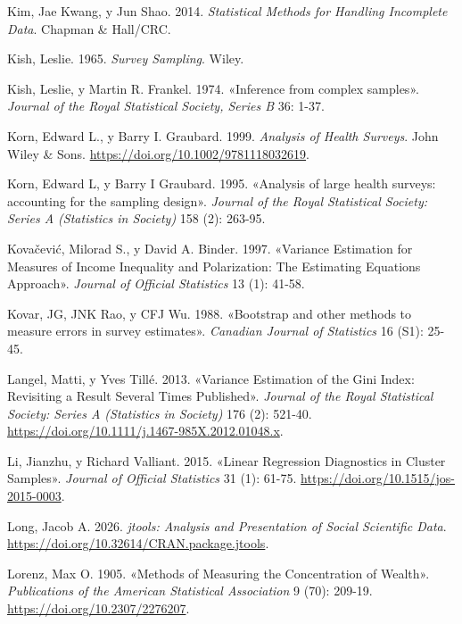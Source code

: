 \documentclass[
  spanish,
  11pt,
  letterpaper,
  oneside,
  open=any]{scrbook}
\newlength{\cslhangindent}
\newenvironment{CSLReferences}[2] %
 {\begin{list}{}{%
  \setlength{\itemindent}{0pt}
  \setlength{\leftmargin}{0pt}
  \setlength{\parsep}{0pt}
  \ifodd #1
   \setlength{\leftmargin}{\cslhangindent}
   \setlength{\itemindent}{-1\cslhangindent}
  \fi
  \setlength{\itemsep}{#2\baselineskip}}}
 {\end{list}}
\begin{document}
\begin{CSLReferences}{1}{1}
Kim, Jae Kwang, y Jun Shao. 2014. \emph{Statistical Methods for Handling
Incomplete Data}. Chapman \& Hall/CRC.

Kish, Leslie. 1965. \emph{Survey Sampling}. Wiley.

Kish, Leslie, y Martin R. Frankel. 1974. {«Inference from complex
samples»}. \emph{Journal of the Royal Statistical Society, Series B} 36:
1-37.

Korn, Edward L., y Barry I. Graubard. 1999. \emph{Analysis of Health
Surveys}. John Wiley \& Sons.
\url{https://doi.org/10.1002/9781118032619}.

Korn, Edward L, y Barry I Graubard. 1995. {«Analysis of large health
surveys: accounting for the sampling design»}. \emph{Journal of the
Royal Statistical Society: Series A (Statistics in Society)} 158 (2):
263-95.

Kovačević, Milorad S., y David A. Binder. 1997. {«Variance Estimation
for Measures of Income Inequality and Polarization: The Estimating
Equations Approach»}. \emph{Journal of Official Statistics} 13 (1):
41-58.

Kovar, JG, JNK Rao, y CFJ Wu. 1988. {«Bootstrap and other methods to
measure errors in survey estimates»}. \emph{Canadian Journal of
Statistics} 16 (S1): 25-45.

Langel, Matti, y Yves Tillé. 2013. {«Variance Estimation of the Gini
Index: Revisiting a Result Several Times Published»}. \emph{Journal of
the Royal Statistical Society: Series A (Statistics in Society)} 176
(2): 521-40. \url{https://doi.org/10.1111/j.1467-985X.2012.01048.x}.

Li, Jianzhu, y Richard Valliant. 2015. {«Linear Regression Diagnostics
in Cluster Samples»}. \emph{Journal of Official Statistics} 31 (1):
61-75. \url{https://doi.org/10.1515/jos-2015-0003}.

Long, Jacob A. 2026. \emph{jtools: Analysis and Presentation of Social
Scientific Data}. \url{https://doi.org/10.32614/CRAN.package.jtools}.

Lorenz, Max O. 1905. {«Methods of Measuring the Concentration of
Wealth»}. \emph{Publications of the American Statistical Association} 9
(70): 209-19. \url{https://doi.org/10.2307/2276207}.


\end{CSLReferences}
\end{document}
